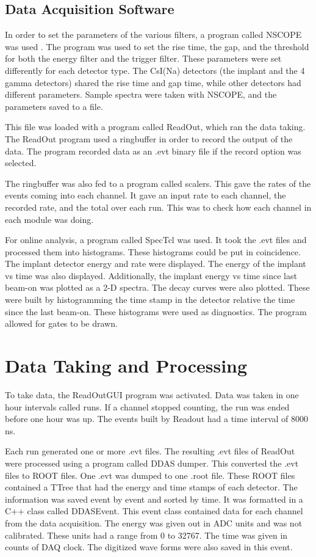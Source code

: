\documentclass[../MaxHughesThesis.tex]{subfiles}
\begin{document}
\subsection{Data Acquisition Software}
In order to set the parameters of the various filters, a program called NSCOPE was used \cite{DAQ17}.
The program was used to set the rise time, the gap, and the threshold for both the energy filter and the trigger filter.
These parameters were set differently for each detector type.
The CsI(Na) detectors (the implant and the 4 gamma detectors) shared the rise time and gap time, while other detectors had different parameters.
Sample spectra were taken with NSCOPE, and the parameters saved to a file.

This file was loaded with a program called ReadOut, which ran the data taking.
The ReadOut program used a ringbuffer in order to record the output of the data.
The program recorded data as an .evt binary file if the record option was selected.

The ringbuffer was also fed to a program called scalers.
This gave the rates of the events coming into each channel.
It gave an input rate to each channel, the recorded rate, and the total over each run.
This was to check how each channel in each module was doing.

For online analysis, a program called SpecTcl was used.
It took the .evt files and processed them into histograms.
These histograms could be put in coincidence.
The implant detector energy and rate were displayed.
The energy of the implant vs time was also displayed.
Additionally, the implant energy vs time since last beam-on was plotted as a 2-D spectra.
The decay curves were also plotted.
These were built by histogramming the time stamp in the detector relative the time since the last beam-on.
These histograms were used as diagnostics. 
The program allowed for gates to be drawn.

\section{Data Taking and Processing}
To take data, the ReadOutGUI program was activated. 
Data was taken in one hour intervals called runs.
If a channel stopped counting, the run was ended before one hour was up. 
The events built by Readout had a time interval of 8000 ns.

Each run generated one or more .evt files. 
The resulting .evt files of ReadOut were processed using a program called DDAS dumper.
This converted the .evt files to ROOT files.
One .evt was dumped to one .root file. 
These ROOT files contained a TTree that had the energy and time stamps of each detector.
The information was saved event by event and sorted by time. 
It was formatted in a C++ class called DDASEvent. 
This event class contained data for each channel from the data acquisition.
The energy was given out in ADC units and was not calibrated.
These units had a range from 0 to 32767.
The time was given in counts of DAQ clock.
The digitized wave forms were also saved in this event. 
\end{document}
